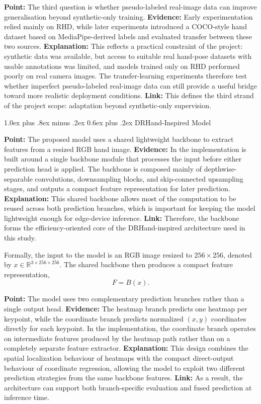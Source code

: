 \documentclass[10pt,letterpaper]{article}
\makeatletter
\renewcommand\subsection{\@startsection{subsection}{2}{\z@}%
  {1.0ex plus .8ex minus .2ex}%
  {0.6ex plus .2ex}%
  {\normalfont\itshape}}
\makeatother
\begin{document}
\medskip
\noindent\textbf{Point:} The third question is whether pseudo-labeled real-image data can improve generalisation beyond synthetic-only training.  
\textbf{Evidence:} Early experimentation relied mainly on RHD, while later experiments introduced a COCO-style hand dataset based on MediaPipe-derived labels and evaluated transfer between these two sources.  
\textbf{Explanation:} This reflects a practical constraint of the project: synthetic data was available, but access to suitable real hand-pose datasets with usable annotations was limited, and models trained only on RHD performed poorly on real camera images. The transfer-learning experiments therefore test whether imperfect pseudo-labeled real-image data can still provide a useful bridge toward more realistic deployment conditions.  
\textbf{Link:} This defines the third strand of the project scope: adaptation beyond synthetic-only supervision.

\subsection{DRHand-Inspired Model}

\noindent\textbf{Point:} The proposed model uses a shared lightweight backbone to extract features from a resized RGB hand image.  
\textbf{Evidence:} In the implementation is built around a single backbone module that processes the input before either prediction head is applied. The backbone is composed mainly of depthwise-separable convolutions, downsampling blocks, and skip-connected upsampling stages, and outputs a compact feature representation for later prediction.  
\textbf{Explanation:} This shared backbone allows most of the computation to be reused across both prediction branches, which is important for keeping the model lightweight enough for edge-device inference.  
\textbf{Link:} Therefore, the backbone forms the efficiency-oriented core of the DRHand-inspired architecture used in this study.

Formally, the input to the model is an RGB image resized to $256 \times 256$, denoted by $x \in \mathbb{R}^{3 \times 256 \times 256}$. The shared backbone then produces a compact feature representation,
\[
F = B(x).
\]

\medskip
\noindent\textbf{Point:} The model uses two complementary prediction branches rather than a single output head.  
\textbf{Evidence:} The heatmap branch predicts one heatmap per keypoint, while the coordinate branch predicts normalized $(x,y)$ coordinates directly for each keypoint. In the implementation, the coordinate branch operates on intermediate features produced by the heatmap path rather than on a completely separate feature extractor.  
\textbf{Explanation:} This design combines the spatial localization behaviour of heatmaps with the compact direct-output behaviour of coordinate regression, allowing the model to exploit two different prediction strategies from the same backbone features.  
\textbf{Link:} As a result, the architecture can support both branch-specific evaluation and fused prediction at inference time.
\end{document}

